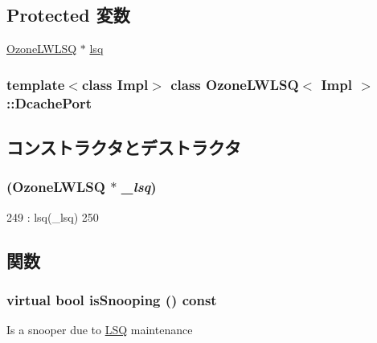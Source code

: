 \subsection*{Protected 変数}
\begin{DoxyCompactItemize}
\item 
\hyperlink{classOzoneLWLSQ}{OzoneLWLSQ} $\ast$ \hyperlink{classOzoneLWLSQ_1_1DcachePort_a792c595626894860987780b90079d2ee}{lsq}
\end{DoxyCompactItemize}
\subsubsection*{template$<$class Impl$>$ class OzoneLWLSQ$<$ Impl $>$::DcachePort}



\subsection{コンストラクタとデストラクタ}
\hypertarget{classOzoneLWLSQ_1_1DcachePort_a5f7643d592d525aed12c1a80f2d9399e}{
\subsubsection[{DcachePort}]{ ({\bf OzoneLWLSQ} $\ast$ {\em \_\-lsq})}}
\label{classOzoneLWLSQ_1_1DcachePort_a5f7643d592d525aed12c1a80f2d9399e}



\begin{DoxyCode}
249             : lsq(_lsq)
250         { }
\end{DoxyCode}


\subsection{関数}
\hypertarget{classOzoneLWLSQ_1_1DcachePort_a32602a6a3c3d66a639455036d6c08dd6}{
\subsubsection[{isSnooping}]{\setlength{\rightskip}{0pt plus 5cm}virtual bool isSnooping () const}}
\label{classOzoneLWLSQ_1_1DcachePort_a32602a6a3c3d66a639455036d6c08dd6}
Is a snooper due to \hyperlink{classLSQ}{LSQ} maintenance 

